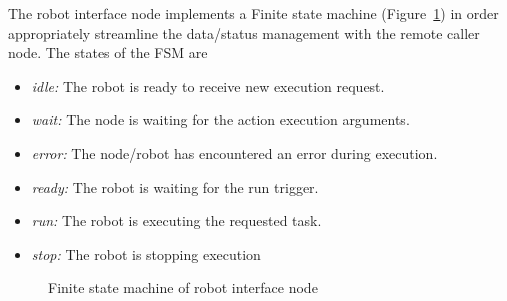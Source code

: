 The robot interface node implements a Finite state machine (Figure~\ref{fig:robot_fsm}) in order appropriately streamline the data/status management with the remote caller node. The states of the FSM are
\begin{itemize}[leftmargin={1cm},topsep={0pt},itemsep={0pt},partopsep={0pt},parsep={0pt}] 
\item \emph{idle:} The robot is ready to receive new execution request.
\item \emph{wait:} The node is waiting for the action execution arguments.
\item \emph{error:} The node/robot has encountered an error during execution.
\item \emph{ready:} The robot is waiting for the run trigger.
\item \emph{run:} The robot is executing the requested task.
\item \emph{stop:} The robot is stopping execution
\end{itemize}
\begin{figure}[H]
\centering
{}
\caption[Finite state machine of robot interface node]{Finite state machine of robot interface node}
\label{fig:robot_fsm}
\end{figure}
